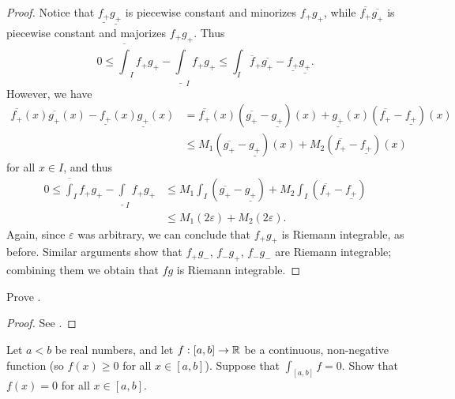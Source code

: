 \begin{proof}
  Notice that \(\underline{f_+} \underline{g_+}\) is piecewise constant and minorizes \(f_+ g_+\), while \(\overline{f_+} \overline{g_+}\) is piecewise constant and majorizes \(f_+ g_+\).
  Thus
  \[
    0 \leq \overline{\int}_I f_+ g_+ - \underline{\int}_I f_+ g_+ \leq \int_I \overline{f}_+ \overline{g_+} - \underline{f_+} \underline{g_+}.
  \]
  However, we have
  \begin{align*}
    \overline{f_+}(x) \overline{g_+}(x) - \underline{f_+}(x) \underline{g_+}(x) & = \overline{f_+}(x) (\overline{g_+} - \underline{g_+})(x) + \underline{g_+}(x) (\overline{f_+} - \underline{f_+})(x) \\
                                                                                & \leq M_1 (\overline{g_+} - \underline{g_+})(x) + M_2 (\overline{f_+} - \underline{f_+})(x)
  \end{align*}
  for all \(x \in I\), and thus
  \begin{align*}
    0 \leq \overline{\int}_I f_+ g_+ - \underline{\int}_I f_+ g_+ & \leq M_1 \int_I (\overline{g_+} - \underline{g_+}) + M_2 \int_I (\overline{f_+} - \underline{f_+}) \\
                                                                  & \leq M_1 (2\varepsilon) + M_2 (2\varepsilon).
  \end{align*}
  Again, since \(\varepsilon\) was arbitrary, we can conclude that \(f_+ g_+\) is Riemann integrable, as before.
  Similar arguments show that \(f_+ g_-\), \(f_- g_+\), \(f_- g_-\) are Riemann integrable;
  combining them we obtain that \(fg\) is Riemann integrable.
\end{proof}

\exercisesection

\begin{ex}\label{i:ex:11.4.1}
  Prove .
\end{ex}

\begin{proof}
  See .
\end{proof}

\begin{ex}\label{i:ex:11.4.2}
  Let \(a < b\) be real numbers, and let \(f : [a, b] \to \mathbb{R}\) be a continuous, non-negative function
  (so \(f(x) \geq 0\) for all \(x \in [a, b]\)).
  Suppose that \(\int_{[a, b]} f = 0\).
  Show that \(f(x) = 0\) for all \(x \in [a, b]\).
\end{ex}

